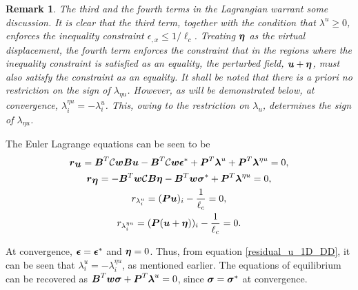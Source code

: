 \documentclass[10pt]{elsarticle}
\newtheorem*{remark}{Remark}
\begin{document}
\begin{remark}
	The third and the fourth terms in the Lagrangian warrant some discussion. It is clear that the third term, together with the condition that $\lambda^u\geq0$, enforces the inequality constraint $\epsilon_{,x} \leq 1/\ell_c$. Treating $\mbox{\boldmath $\eta$}$ as the virtual displacement, the fourth term enforces the constraint that in the regions where the inequality constraint is satisfied as an equality, the perturbed field, $\mbox{\boldmath $u$}+\mbox{\boldmath $\eta$}$, must also satisfy the constraint as an equality. It shall be noted that there is a priori no restriction on the sign of $\lambda_{\eta u}$. However, as will be demonstrated below, at convergence, $\lambda^{\eta u}_i = -\lambda^{ u}_i$. This, owing to the restriction on $\lambda_u$, determines the sign of $\lambda_{\eta u}$.
\end{remark}

 


The Euler Lagrange equations can be seen to be
\begin{gather}
	\mbox{\boldmath $r$}_{\mbox{\boldmath $u$}} = \mbox{\boldmath $B$}^T \mathcal{C}\mbox{\boldmath $w$} \mbox{\boldmath $B$} \mbox{\boldmath $u$} - \mbox{\boldmath $B$}^T \mathcal{C}\mbox{\boldmath $w$} \mbox{\boldmath $\epsilon$} ^* + \mbox{\boldmath $P$}^T \mbox{\boldmath $\lambda$}^u +\mbox{\boldmath $P$}^T \mbox{\boldmath $\lambda$}^{\eta u}  =0, \label{residual_u_1D_DD} \\
	\mbox{\boldmath $r$}_{\mbox{\boldmath $\eta$}} = -\mbox{\boldmath $B$}^T\mbox{\boldmath $w$} \mathcal{C} \mbox{\boldmath $B$} \mbox{\boldmath $\eta$} - \mbox{\boldmath $B$}^T\mbox{\boldmath $w$} \mbox{\boldmath $\sigma$} ^* +\mbox{\boldmath $P$}^T \mbox{\boldmath $\lambda$}^{\eta u} =0, \\
	r_{\lambda^u_i} =  (\mbox{\boldmath $P$} \mbox{\boldmath $u$})_i - \frac{1}{\ell_c}  =0, \\
	r_{\lambda^{\eta u}_i} =  (\mbox{\boldmath $P$} (\mbox{\boldmath $u$} + \mbox{\boldmath $\eta$}))_i - \frac{1}{\ell_c}  =0. 
\end{gather}

At convergence, $\mbox{\boldmath $\epsilon$}=\mbox{\boldmath $\epsilon$}^*$ and $\mbox{\boldmath $\eta$}=0$. Thus, from equation \ref{residual_u_1D_DD}, it can be seen that $\lambda^u_i = -\lambda^{\eta u}_i$, as mentioned earlier. The equations of equilibrium can be recovered as $\mbox{\boldmath $B$}^T \mbox{\boldmath $w$} \mbox{\boldmath $\sigma$} +\mbox{\boldmath $P$}^T \mbox{\boldmath $\lambda$}^{u} =0$, since $\mbox{\boldmath $\sigma$} = \mbox{\boldmath $\sigma$}^*$ at convergence.
\end{document}

